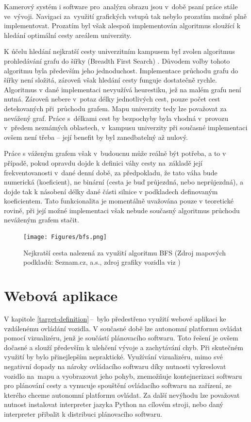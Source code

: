 \documentclass[czech, bachelor]{diploma}
\newcommand{\peteref}[1]{\ref{#1}\,--\,\nameref{#1}}
\begin{document}
Kamerový systém i software pro~analýzu obrazu jsou v~době psaní práce stále ve~vývoji. Navigaci za~využití grafických vstupů
tak nebylo prozatím možné plně implementovat. Prozatím byl však alespoň implementován algoritmus sloužící k hledání optimální
cesty areálem univerzity.

K účelu hledání nejkratší cesty univerzitním kampusem byl zvolen algoritmus prohledávání grafu do šířky (Breadth First Search)
\cite{bfs-source}.  Důvodem volby tohoto algoritmu byla především jeho jednoduchost. Implementace průchodu grafu do šířky není
složitá, zároveň však hledání cesty funguje dostatečně rychle. Algoritmus v dané implementaci nevyužívá heurestiku, jež na malém
grafu není nutná. Zároveň nebere v~potaz délky jednotlivých cest, pouze počet cest detekovaných při~průchodu grafem. Mapu
univerzity tedy lze považovat za nevážený graf. Práce s~délkami cest by bezpochyby byla vhodná v~provozu v~předem neznámých
oblastech, v~kampusu univerzity při současné implementaci ovšem není třeba -- její benefit by byl zanedbatelný až nulový.

Práce s váženým grafem však v~budoucnu může reálně být potřeba, a to v případě, pokud opravdu dojde k definici váhy cesty
na~základě její frekventovanosti v~dané denní době, za předpokladu, že tato váha bude numerická (koeficient), ne binární 
(cesta je buď průjezdná, nebo neprůjezdná), a dojde tak k násobení délky dané části silnice v podkladech definovaným koeficientem.
Tato funkcionalita je momentálně uvažována pouze v teoretické rovině, při její možné implementaci však nebude současný algoritmus
průchodu neváženým grafem stačit.

\begin{figure}
    \centering
    \texttt{[image: Figures/bfs.png]}
    \caption{Nejkratší cesta nalezená za využití algoritmu BFS (Zdroj mapových podkladů: Seznam.cz, a.s., zdroj grafiky
    vozidla viz \cite{car-sprite-source})}
    \label{fig:bfs}
\end{figure}

\chapter{Webová aplikace} \label{web-app}

V kapitole \peteref{target-definition} bylo předestřeno využití webové aplikaci ke vzdálenému ovládání vozidla. V současné době
lze autonomní platformu ovládat pomocí vizualizéru, jenž je součástí plánovacího softwaru. Toto řešení je ovšem dočasné a slouží
především k ulehčení vývoje a zachytávání chyb. Při skutečném využití by bylo přinejlepším nepraktické. Využívání vizualizéru,
mimo své negativní dopady na nároky ovládacího softwaru díky nutnosti vykreslovat vozidlo na~mapu a vyobrazovat jeho pohyb,
znemožňuje kontejnerizaci softwaru pro plánování cesty a vynucuje spouštění ovládacího softwaru na zařízení, ze kterého chceme
autonomní platformu ovládat. Za další nevýhodu lze považovat nutnost instalovat interpreter jazyka Python na cílovém stroji, nebo
daný interpreter přibalit k distribuci plánovacího softwaru.
\end{document}
